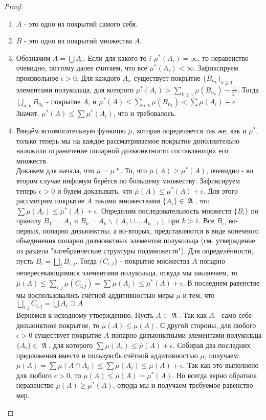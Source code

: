 \documentclass[a4paper]{article}
\theoremstyle{indented}
\theoremstyle{definition}
\theoremstyle{remark}
\DeclareMathOperator{\GA}{\mathfrak{A}}
\begin{document}
\begin{proof}
\

\begin{enumerate}
    \item $A$ - это одно из покрытий самого себя.
    \item $B$ - это одно из покрытий множества $A$.
    \item Обозначим $A=\bigcup A_i$. Если для какого-то $i$ $\mu^*(A_i)=\infty$, то неравенство очевидно, поэтому далее считаем, что все $\mu^*(A_i)< \infty$. Зафиксируем произвольное $\epsilon > 0$. Для каждого $A_n$ существует покрытие $\{B_{n_k}\}_{k \geq 1}$ элементами полукольца, для которого $\mu^*(A_i)> \sum_{k \geq 1} \mu(B_{n_k}) - \frac{\epsilon}{2^n}$. Тогда $\bigcup_{n, k} B_{n_k}$ - покрытие $A$, и $\mu^*(A) \leq \sum_{n, k}\mu(B_{n_k}) < \sum \mu(A_i) + \epsilon $. Значит,  $\mu^*(A) \leq \sum \mu^*(A_i)$, что и требовалось.
    \item Введём вспомогательную функицю $\overline{\mu}$, которая определяется так же, как и $\mu^*$, только теперь мы на каждое рассматриваемое покрытие дополнительно наложили ограничение попарной дизъюнктности составляющих его множеств. 
    \\
    Докажем для начала, что $\overline{\mu}=\mu*$. То, что $\overline{\mu}(A) \geq \mu^*(A)$, очевидно - во втором случае инфимум берётся по большему множеству. Зафиксируем теперь $\epsilon > 0$ и будем доказывать, что $\overline{\mu}(A) \leq \mu^*(A)+\epsilon$. Для этого рассмотрим покрытие $A$ такими множествами $\{A_i\} \in \GA$, что $\sum \mu(A_i) \leq \mu^*(A)+\epsilon$. Определим последовательность множеств $\{B_i\}$ по правилу $B_1:=A_1$ и $B_k = A_k \backslash (A_1 \cup ... A_{k-1})$ при $k>1$. Все $B_i$, во-первых, попарно дизъюнктны, а во-вторых, представляются в виде конечного объединения попарно дизъюнктных элементов полукольца (см. утверждение из раздела "алгебраические структуры подмножеств"). Для определённости, пусть $B_i= \bigsqcup_j B_{i, j}$. Тогда $\{C_{i, j}\}$ - покрытие множества $A$ попарно непересекающимися элементами полукольца, откуда мы заключаем, то $\overline{\mu}(A) \leq \sum_{i, j} \mu(C_{i, j}) = \sum \mu(A_i) \leq \mu^*(A)+\epsilon$. В последнем равенстве мы воспользовались счётной аддитивностью меры $
    \mu$ и тем, что $\bigsqcup_{i, j} C_{i, j} = \bigcup A_i \supset A$
    \\ 
    Вернёмся к исходному утверждению. Пусть $A \in \GA$. Так как $A$ - само себе дизъюнктное покрытие, то $\overline{\mu}(A) \leq \mu(A)$. С другой стороны, для любого $\epsilon > 0$ существует покрытие $A$ попарно дизъюнктными элементами полукольца $\{A_i\} \in \GA$, для которого $\sum \mu(A_i) \leq \overline{\mu}(A)+\epsilon$. Собирая два последних предложения вместе и пользуясбь счётной аддитивностью $\mu$, получаем: $\mu(A) = \sum \mu(A \cap A_i) \leq \sum \mu(A_i) \leq \overline{\mu}(A)+\epsilon$. Так как это выполнено для любого $\epsilon>0$, то $\mu(A) \leq \overline{\mu}(A)=\mu^*(A)$. Но всегда верно обратное неравенство $\mu(A) \geq \mu^*(A)$, откуда мы и получаем требуемое равенство мер.
\end{enumerate}
\end{proof}
\end{document}
